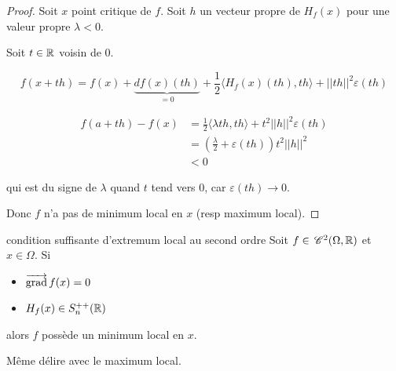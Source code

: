 
\begin{proof}
    Soit $x$ point critique de $f$. Soit $h$ un vecteur propre de 
    $H_f(x)$ pour une valeur propre $\lambda < 0$. 

    Soit $t \in \mathbb{R}$ voisin de $0$.

    $$f(x + th) = f(x) + \underbrace{df(x)(th)}_{= 0} + \frac 1 2 \langle H_f(x) (th), th \rangle + ||th||^2 \varepsilon(th)$$
    
    \begin{align}
        f(a + th) - f(x) & = \frac{1} 2 \langle \lambda th, th \rangle + t^2 ||h||^2 \varepsilon(th) \\
        & = \left( \frac \lambda 2 + \varepsilon(th) \right) t^2 ||h||^2 \\
        & < 0
    \end{align}

    qui est du signe de $\lambda$ quand $t$ tend vers $0$, car $\varepsilon(th) \to 0$.

    Donc $f$ n'a pas de minimum local en $x$ (resp maximum local).
\end{proof}

\begin{theoreme}{condition suffisante d'extremum local au second ordre}{}
    Soit $f \in \,\mathscr C^{2} (\Omega, \mathbb{R})$ et $x \in \Omega$. Si 
    \begin{itemize}
        \item $\overrightarrow{\operatorname{grad}} \, f(x) = 0$
        \item $H_f(x) \in S_n^{++}(\mathbb{R})$ 
    \end{itemize}
    alors $f$ possède un minimum local en $x$.
\end{theoreme}

\begin{remarque}
    Même délire avec le maximum local.
\end{remarque}


